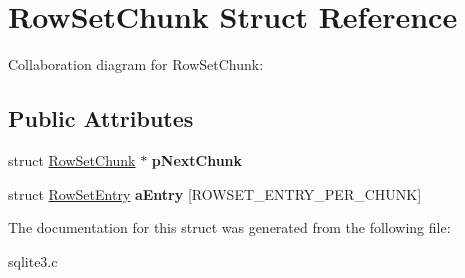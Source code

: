 \hypertarget{structRowSetChunk}{}\section{Row\+Set\+Chunk Struct Reference}
\label{structRowSetChunk}


Collaboration diagram for Row\+Set\+Chunk\+:
\subsection*{Public Attributes}
\begin{DoxyCompactItemize}
\item 
struct \hyperlink{structRowSetChunk}{Row\+Set\+Chunk} $\ast$ {\bfseries p\+Next\+Chunk}\hypertarget{structRowSetChunk_ae8f0975c86633ae2bb8b212d3a767554}{}\label{structRowSetChunk_ae8f0975c86633ae2bb8b212d3a767554}

\item 
struct \hyperlink{structRowSetEntry}{Row\+Set\+Entry} {\bfseries a\+Entry} \mbox{[}R\+O\+W\+S\+E\+T\+\_\+\+E\+N\+T\+R\+Y\+\_\+\+P\+E\+R\+\_\+\+C\+H\+U\+NK\mbox{]}\hypertarget{structRowSetChunk_abde97bbb07c3bf9454e719ff860bdd1f}{}\label{structRowSetChunk_abde97bbb07c3bf9454e719ff860bdd1f}

\end{DoxyCompactItemize}


The documentation for this struct was generated from the following file\+:\begin{DoxyCompactItemize}
\item 
sqlite3.\+c\end{DoxyCompactItemize}
